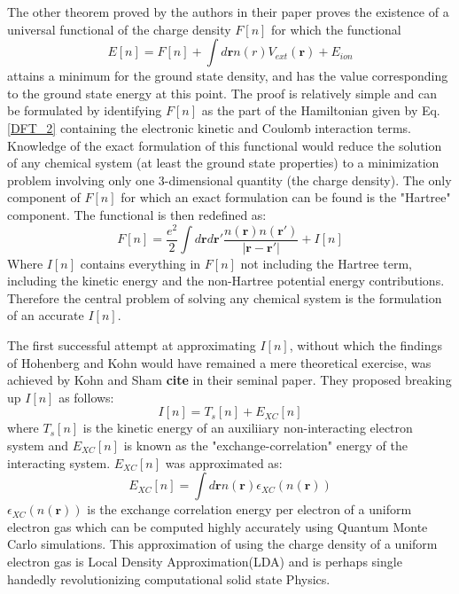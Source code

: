 \documentclass[12pt,letter]{article}
\newcommand{\rmb}{\mathbf{r}}
\newcommand{\dens}{n(\rmb)}
\begin{document}
The other theorem proved by the authors in their paper proves the existence of   a universal functional of the charge density $F[n]$ for which the functional
\begin{equation}
E[n]=F[n] +\int d \rmb n(r) V_{ext}(\rmb) + E_{ion} 
\end{equation}
attains a minimum for the ground state density, and has the value corresponding to the ground state energy at this point. The proof is relatively simple and can be formulated by identifying $F[n]$ as the part of the Hamiltonian given by Eq. \ref{DFT_2} containing the electronic kinetic and Coulomb interaction terms. Knowledge of the exact formulation of this functional would reduce the solution of any chemical system (at least the ground state properties) to a minimization problem involving only one 3-dimensional quantity (the charge density). The only component of $F[n]$ for which an exact formulation can be found is the "Hartree" component. The functional is then redefined as:
\begin{equation}
 F[n]= \dfrac{e^2}{2}\int d\rmb d\rmb' \dfrac{n(\rmb) n(\rmb')}{|\rmb-\rmb'|} + I[n]
 \end{equation} 
Where $I[n]$ contains everything in $F[n]$ not including the Hartree term, including the kinetic energy and the non-Hartree potential energy contributions. Therefore the central problem of solving any chemical system is the formulation of an accurate $I[n]$.

The first successful attempt at approximating $I[n]$, without which the findings of Hohenberg and Kohn would have remained a mere theoretical exercise, was achieved by Kohn and Sham \textbf{cite} in their seminal paper. They proposed breaking up $I[n]$ as follows:
\begin{equation}
 I[n]=T_s[n]+E_{XC}[n]
 \end{equation} 
where $T_s[n]$ is the kinetic energy of an auxiliiary non-interacting electron system and $E_{XC}[n]$ is known as the "exchange-correlation" energy of the interacting system. $E_{XC}[n]$ was approximated as:
\begin{equation}
E_{XC}[n]=\int d\rmb \dens \epsilon_{XC}(\dens)
\end{equation}
$\epsilon_{XC}(\dens)$ is the exchange correlation energy per electron of a uniform electron gas which can be computed highly accurately using Quantum Monte Carlo simulations. This approximation of using the charge density of a uniform electron gas is Local Density Approximation(LDA) and is perhaps single handedly revolutionizing computational solid state Physics. 
\end{document}
